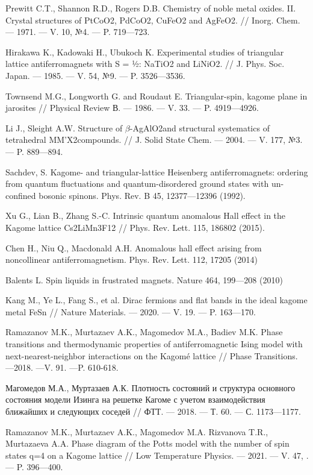 \begin{thebibliography}{111}
Prewitt C.T., Shannon R.D., Rogers D.B.
Chemistry of noble metal oxides. II. Crystal structures of PtCoO2, PdCoO2, CuFeO2 and AgFeO2.
//
Inorg. Chem.
--- 1971.
--- V. 10, №4.
--- P. 719---723.

Hirakawa K., Kadowaki H., Ubukoch K.
Experimental studies of triangular lattice antiferromagnets with S = ½: NaTiO2 and LiNiO2.
//
J. Phys. Soc. Japan.
--- 1985.
--- V. 54, №9.
--- P. 3526---3536.

Townsend M.G., Longworth G. and Roudaut E.
Triangular-spin, kagome plane in jarosites
//
Physical Review В.
--- 1986.
--- V. 33.
--- P. 4919---4926.

Li J., Sleight A.W.
Structure of $\beta$-AgAlO2and structural systematics of tetrahedral MM'X2compounds.
//
J. Solid State Chem.
--- 2004.
--- V. 177, №3.
--- P. 889---894.

Sachdev, S.
Kagome- and triangular-lattice Heisenberg antiferromagnets: ordering from quantum fluctuations and quantum-disordered ground states with un-confined bosonic spinons. Phys. Rev. B 45, 12377---12396 (1992).

Xu G., Lian B., Zhang S.-C.
Intrinsic quantum anomalous Hall effect in the Kagome lattice Cs2LiMn3F12
//
Phys. Rev. Lett. 115, 186802 (2015).

Chen H., Niu Q., Macdonald A.H.
Anomalous hall effect arising from noncollinear antiferromagnetism. Phys. Rev. Lett. 112, 17205 (2014)

Balents L.
Spin liquids in frustrated magnets. Nature 464, 199---208 (2010)

Kang M., Ye L., Fang S., et al.
Dirac fermions and flat bands in the ideal kagome metal FeSn
//
Nature Materials.
--- 2020.
--- V. 19.
--- P. 163---170.

Ramazanov M.K., Murtazaev A.K., Magomedov M.A., Badiev M.K.
Phase transitions and thermodynamic properties of antiferromagnetic Ising model with next-nearest-neighbor interactions on the Kagomé lattice
//
Phase Transitions. ---2018. ---V. 91. ---P. 610-618.

Магомедов М.А., Муртазаев А.К.
Плотность состояний и структура основного состояния модели Изинга на решетке Кагоме с учетом взаимодействия ближайших и следующих соседей
//
ФТТ.
--- 2018.
--- Т. 60.
--- С. 1173---1177.

Ramazanov M.K., Murtazaev A.K., Magomedov M.A. Rizvanova T.R., Murtazaeva A.A.
Phase diagram of the Potts model with the number of spin states q=4 on a Kagome lattice
//
Low Temperature Physics.
--- 2021.
--- V. 47, .
--- P. 396---400.


\end{thebibliography}
